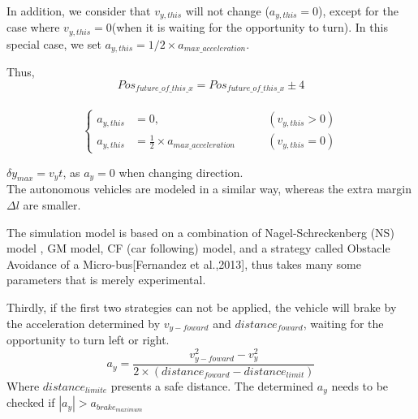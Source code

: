 \documentclass{mcmthesis}
\begin{document}
In addition, we consider that $v_{y,this}$ will not change ($a_{y,this} = 0$), except for the case where $v_{y,this} = 0$(when it is waiting for the opportunity to turn). In this special case, we set $a_{y,this} = 1/2 \times a_{max \_ acceleration}$.

Thus, \\
$$Pos_{future\_of\_this\_x} = Pos_{future\_of\_this\_x} \pm 4$$\\
$$\left\{ 
\begin{aligned}
a_{y,this} &= 0 ,   \qquad& (v_{y,this} > 0)\\
a_{y,this} &= \frac{1}{2}\times a_{max \_ acceleration} \qquad &(v_{y,this} = 0)
\end{aligned}
\right.
$$

 $\delta y_{max}=v_yt$, as $a_y=0$ when changing direction.\\


The autonomous vehicles are modeled in a similar way, whereas the extra margin $\Delta l$ are smaller. 

The simulation model is based on a combination of Nagel-Schreckenberg (NS) model \cite{acelluar}, GM model, CF (car following) model, and a strategy called Obstacle Avoidance of a Micro-bus[Fernandez et al.,2013], thus takes many some parameters that is merely experimental.

Thirdly, if the first two strategies can not be applied, the vehicle will brake by the acceleration determined by $v_{y-{foward}}$ and $distance_{foward}$, waiting for the opportunity to turn left or right.
$$
	a_y = \frac{v_{y-foward}^2 - v_y^2}{2\times(distance_{foward} - distance_{limit})}
$$
	Where $distance_{limite}$ presents a safe distance.
	The determined $a_y$ needs to be checked if  $|a_y| > a_{brake_{maximum}} $ 
\end{document}
